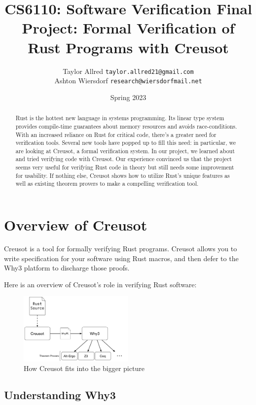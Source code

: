 \documentclass[12pt]{article}
\title{CS6110: Software Verification Final Project: Formal Verification of Rust Programs with Creusot}
\author{Taylor Allred \texttt{taylor.allred21@gmail.com}\\ Ashton Wiersdorf \texttt{research@wiersdorfmail.net}}
\date{Spring 2023}
\begin{document}
\maketitle

\begin{abstract}
\noindent
Rust is the hottest new language in systems programming.
Its linear type system provides compile-time guarantees about memory resources and avoids race-conditions.
With an increased reliance on Rust for critical code, there's a greater need for verification tools.
Several new tools have popped up to fill this need: in particular, we are looking at Creusot, a formal verification system.
In our project, we learned about and tried verifying code with Creusot.
Our experience convinced us that the project seems very useful for verifying Rust code in theory but still needs some improvement for usability. 
If nothing else, Creusot shows how to utilize Rust's unique features as well as existing theorem provers to make a compelling verification tool. 
\end{abstract}

\setcounter{tocdepth}{2}
\tableofcontents

\section{Overview of Creusot}

Creusot\cite{denisCreusot2023} is a tool for formally verifying Rust programs.
Creusot allows you to write specification for your software using Rust macros, and then defer to the Why3\cite{bobotWhy3ShepherdYour} platform to discharge those proofs.

Here is an overview of Creusot's role in verifying Rust software:

\begin{figure}[h]
  \centering
\includegraphics[width=0.5\textwidth]{creusot_why3_diagram}
\caption{How Creusot fits into the bigger picture}
\end{figure}

\subsection{Understanding Why3}
\end{document}
